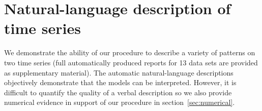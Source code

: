 \documentclass{article}
\def\eg{e.g.\ }
\begin{document}









\section{Natural-language description of time series}
\label{sec:examples}
We demonstrate the ability of our procedure to describe a variety of patterns on two time series (full automatically produced reports for 13 data sets are provided as supplementary material).
The automatic natural-language descriptions objectively demonstrate that the models can be interpreted.
However, it is difficult to quantify the quality of a verbal description so we also provide numerical evidence in support of our procedure in section~\ref{sec:numerical}.
\end{document}
